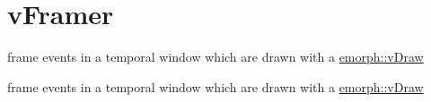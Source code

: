 \hypertarget{group__vFramer}{\section{v\-Framer}
\label{group__vFramer}
}


frame events in a temporal window which are drawn with a \hyperlink{classemorph_1_1vDraw}{emorph\-::v\-Draw}  


frame events in a temporal window which are drawn with a \hyperlink{classemorph_1_1vDraw}{emorph\-::v\-Draw} 